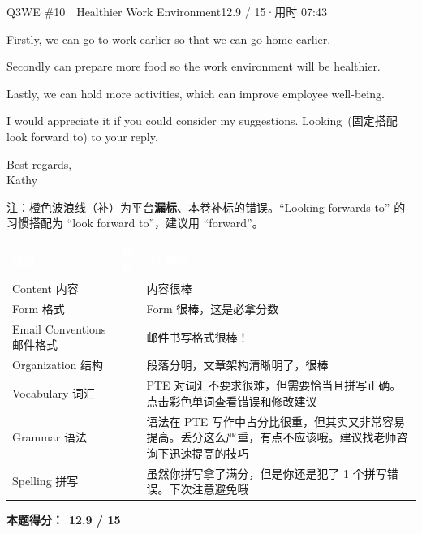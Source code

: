 \begin{qblock}{Q3\quad WE \#10\ \ Healthier Work Environment}{12.9 / 15\quad·\quad 用时 07:43}
\begin{youbox}
Firstly, we can go to work earlier so that we can go home earlier.

Secondly can prepare more food\ins{,} so the work environment will be  healthier.

Lastly, we can hold more activities, which can improve employee well-being.

I would appreciate it if you could consider my suggestions. Looking \,(固定搭配 look forward to) to your reply.

Best regards,\\ Kathy
\end{youbox}
{\footnotesize\color{gray} 注：橙色波浪线（补）为平台\textbf{漏标}、本卷补标的错误。``Looking forwards to'' 的习惯搭配为 ``look forward to''，建议用 ``forward''。}

{\small\scorehead
\begin{tabularx}{\linewidth}{l c Y}
\textcolor{white}{\bfseries 维度} & \textcolor{white}{\bfseries 得分} & \textcolor{white}{\bfseries AI 建议}\\
Content 内容              &    & 内容很棒\\
Form 格式                &    & Form 很棒，这是必拿分数\\
Email Conventions 邮件格式 &    & 邮件书写格式很棒！\\
Organization 结构         &    & 段落分明，文章架构清晰明了，很棒\\
Vocabulary 词汇           &  & PTE 对词汇不要求很难，但需要恰当且拼写正确。点击彩色单词查看错误和修改建议\\
Grammar 语法              &  & 语法在 PTE 写作中占分比很重，但其实又非常容易提高。丢分这么严重，有点不应该哦。建议找老师咨询下迅速提高的技巧\\
Spelling 拼写             &    & 虽然你拼写拿了满分，但是你还是犯了 1 个拼写错误。下次注意避免哦\\
\end{tabularx}}
\smallskip
\textbf{本题得分：}\ {\color{cAccent}\bfseries 12.9 / 15}

\end{qblock}

